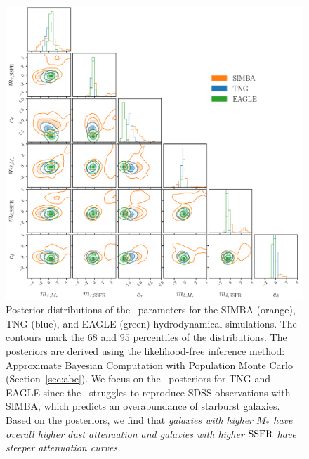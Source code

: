 \begin{figure}
\begin{center}
    \includegraphics[width=\textwidth]{figs/abc.pdf}
    \caption{\label{fig:abc}
    Posterior distributions of the \eda~parameters for the SIMBA (orange), TNG
    (blue), and EAGLE (green) hydrodynamical simulations. The contours mark the $68$
    and $95$ percentiles of the distributions. The posteriors are derived using the
    likelihood-free inference method: Approximate Bayesian Computation with
    Population Monte Carlo (Section~\ref{sec:abc}). We focus on the
    \eda~posteriors for TNG and EAGLE since the \eda~struggles to reproduce
    SDSS observations with SIMBA, which predicts an overabundance of starburst
    galaxies. Based on the posteriors, we find that \emph{galaxies with higher
    $M_*$ have overall higher dust attenuation and galaxies with higher ${\rm SSFR}$
    have steeper attenuation curves.}
    }
\end{center}
\end{figure}

